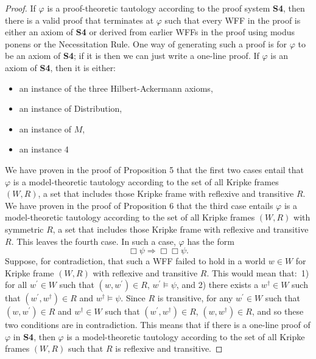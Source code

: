 \documentclass[11pt]{article}
\theoremstyle{definition}
\theoremstyle{remark}
\begin{document}
\begin{proof}
    If $\varphi$ is a proof-theoretic tautology according to the proof system \textbf{S4}, then there is a valid proof that terminates at $\varphi$ such that every WFF in the proof is either an axiom of \textbf{S4} or derived from earlier WFFs in the proof using modus ponens or the Necessitation Rule. One way of generating such a proof is for $\varphi$ to be an axiom of \textbf{S4}; if it is then we can just write a one-line proof. If $\varphi$ is an axiom of \textbf{S4}, then it is either:
    \begin{itemize}
    \item an instance of the three Hilbert-Ackermann axioms,
    
    \item an instance of Distribution, 
    
    \item an instance of $M$,

    \item an instance 4
    \end{itemize}
    We have proven in the proof of Proposition 5 that the first two cases entail that $\varphi$ is a model-theoretic tautology according to the set of all Kripke frames $(W,R)$, a set that includes those Kripke frame with reflexive and transitive $R$. We have proven in the proof of Proposition 6 that the third case entails $\varphi$ is a model-theoretic tautology according to the set of all Kripke frames $(W,R)$ with symmetric $R$, a set that includes those Kripke frame with reflexive and transitive $R$. This leaves the fourth case. In such a case, $\varphi$ has the form
    $$\Box\psi\Rightarrow\Box\Box\psi.$$
    Suppose, for contradiction, that such a WFF failed to hold in a world $w\in W$ for Kripke frame $(W,R)$ with reflexive and transitive $R$. This would mean that:\ 1) for all $w^{\prime}\in W$ such that $(w,w^{\prime})\in R$, $w^{\prime}\vDash \psi$, and 2) there exists a $w^{\dagger}\in W$ such that $(w^{\prime},w^{\dagger})\in R$ and $w^{\dagger}\vDash \psi$. Since $R$ is transitive, for any $w^{\prime}\in W$ such that $(w,w^{\prime})\in R$ and $w^{\dagger}\in W$ such that $(w^{\prime},w^{\dagger})\in R$, $(w,w^{\dagger})\in R$, and so these two conditions are in contradiction. This means that if there is a one-line proof of $\varphi$ in \textbf{S4}, then $\varphi$ is a model-theoretic tautology according to the set of all Kripke frames $(W,R)$ such that $R$ is reflexive and transitive.\par 



\end{proof}
\end{document}
